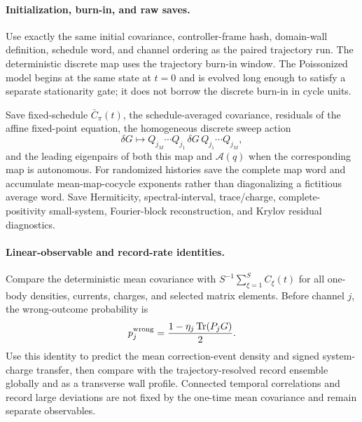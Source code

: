 \documentclass[aps,prx,onecolumn,nofootinbib,superscriptaddress,longbibliography]{revtex4-2}
\newcommand{\qTr}{\operatorname{Tr}}
\begin{document}
\paragraph{Initialization, burn-in, and raw saves.}
Use exactly the same initial covariance, controller-frame hash, domain-wall definition,
schedule word, and channel ordering as the paired trajectory run.  The deterministic
discrete map uses the trajectory burn-in window.  The Poissonized model begins at the same
state at $t=0$ and is evolved long enough to satisfy a separate stationarity gate; it does
not borrow the discrete burn-in in cycle units.

Save fixed-schedule $\bar C_\pi(t)$, the schedule-averaged covariance, residuals of the
affine fixed-point equation, the homogeneous discrete sweep action
\begin{equation}
 \delta G\longmapsto
 Q_{j_M}\cdots Q_{j_1}\,\delta G\,
 Q_{j_1}\cdots Q_{j_M},
 \label{eq:mean-sweep-homogeneous}
\end{equation}
and the leading eigenpairs of both this map and $\mathcal A(q)$ when the corresponding map
is autonomous.  For randomized histories save the complete map word and accumulate
mean-map-cocycle exponents rather than diagonalizing a fictitious average word.  Save Hermiticity,
spectral-interval, trace/charge, complete-positivity small-system, Fourier-block
reconstruction, and Krylov residual diagnostics.

\paragraph{Linear-observable and record-rate identities.}
Compare the deterministic mean covariance with
$S^{-1}\sum_{\xi=1}^S C_\xi(t)$ for all one-body densities, currents, charges, and selected
matrix elements.  Before channel $j$, the wrong-outcome probability is
\begin{equation}
 p_j^{\rm wrong}
 =\frac{1-\eta_j\qTr(P_jG)}{2}.
 \label{eq:mean-wrong-probability}
\end{equation}
Use this identity to predict the mean correction-event density and signed system-charge
transfer, then compare with the trajectory-resolved record ensemble globally and as a transverse wall profile.
Connected temporal correlations and record large deviations are not fixed by the
one-time mean covariance and remain separate observables.
\end{document}
